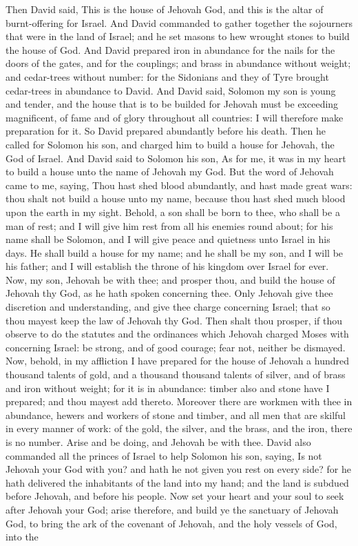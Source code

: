 Then David said, This is the house of Jehovah God, and this is the altar of burnt-offering for Israel.  And David commanded to gather together the sojourners that were in the land of Israel; and he set masons to hew wrought stones to build the house of God. And David prepared iron in abundance for the nails for the doors of the gates, and for the couplings; and brass in abundance without weight; and cedar-trees without number: for the Sidonians and they of Tyre brought cedar-trees in abundance to David. And David said, Solomon my son is young and tender, and the house that is to be builded for Jehovah must be exceeding magnificent, of fame and of glory throughout all countries: I will therefore make preparation for it. So David prepared abundantly before his death.  Then he called for Solomon his son, and charged him to build a house for Jehovah, the God of Israel. And David said to Solomon his son, As for me, it was in my heart to build a house unto the name of Jehovah my God. But the word of Jehovah came to me, saying, Thou hast shed blood abundantly, and hast made great wars: thou shalt not build a house unto my name, because thou hast shed much blood upon the earth in my sight. Behold, a son shall be born to thee, who shall be a man of rest; and I will give him rest from all his enemies round about; for his name shall be Solomon, and I will give peace and quietness unto Israel in his days. He shall build a house for my name; and he shall be my son, and I will be his father; and I will establish the throne of his kingdom over Israel for ever. Now, my son, Jehovah be with thee; and prosper thou, and build the house of Jehovah thy God, as he hath spoken concerning thee. Only Jehovah give thee discretion and understanding, and give thee charge concerning Israel; that so thou mayest keep the law of Jehovah thy God. Then shalt thou prosper, if thou observe to do the statutes and the ordinances which Jehovah charged Moses with concerning Israel: be strong, and of good courage; fear not, neither be dismayed. Now, behold, in my affliction I have prepared for the house of Jehovah a hundred thousand talents of gold, and a thousand thousand talents of silver, and of brass and iron without weight; for it is in abundance: timber also and stone have I prepared; and thou mayest add thereto. Moreover there are workmen with thee in abundance, hewers and workers of stone and timber, and all men that are skilful in every manner of work: of the gold, the silver, and the brass, and the iron, there is no number. Arise and be doing, and Jehovah be with thee.  David also commanded all the princes of Israel to help Solomon his son, saying, Is not Jehovah your God with you? and hath he not given you rest on every side? for he hath delivered the inhabitants of the land into my hand; and the land is subdued before Jehovah, and before his people. Now set your heart and your soul to seek after Jehovah your God; arise therefore, and build ye the sanctuary of Jehovah God, to bring the ark of the covenant of Jehovah, and the holy vessels of God, into the 